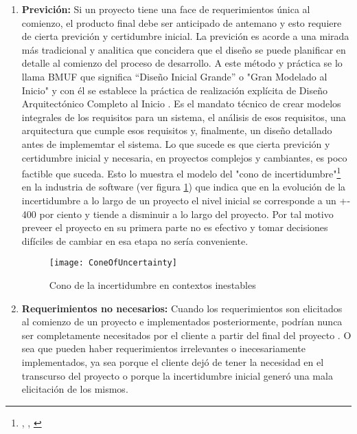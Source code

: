 \begin{enumerate}

\item \textbf{Previción:} \newline
Si un proyecto tiene una face de requerimientos única al comienzo, el producto final debe ser anticipado de antemano \cite{Scrum-Institute-2015} y esto requiere de cierta previción y certidumbre inicial. La previción es acorde a una mirada más tradicional y analitica que concidera que el diseño se puede planificar en detalle al comienzo del proceso de desarrollo. A este método y práctica se lo llama BMUF que significa “Diseño Inicial Grande” o "Gran Modelado al Inicio" y con él se establece la práctica de realización explícita de Diseño Arquitectónico Completo al Inicio \cite{Wiley-Sons-2002}. Es el mandato técnico de crear modelos integrales de los requisitos para un sistema, el análisis de esos requisitos, una arquitectura que cumple esos requisitos y, finalmente, un diseño detallado antes de implememtar el sistema. Lo que sucede es que cierta previción y certidumbre inicial y necesaria, en proyectos complejos y cambiantes, es poco factible que suceda. Esto lo muestra el modelo del "cono de incertidumbre"\footnote{\cite{McConnell-2006}, \cite{Boehm-1981}, \cite{Martin-Alaimo-2014}} en la industria de software (ver figura \ref{fig:ConeOfUncertainty}) que indica que en la evolución de la incertidumbre a lo largo de un proyecto el nivel inicial se corresponde a un +- 400 por ciento y tiende a disminuir a lo largo del proyecto. Por tal motivo preveer el proyecto en su primera parte no es efectivo y tomar decisiones difíciles de cambiar en esa etapa no sería conveniente.

\begin{figure}[h]
  \centering
  \texttt{[image: ConeOfUncertainty]}
  \caption{Cono de la incertidumbre en contextos inestables}
  \centering
  \label{fig:ConeOfUncertainty} %
\end{figure}

\item \textbf{Requerimientos no necesarios:} \newline
Cuando los requerimientos son elicitados al comienzo de un proyecto e implementados posteriormente, podrían nunca ser completamente necesitados por el cliente a partir del final del proyecto \cite{Scrum-Institute-2015}. O sea que pueden haber requerimientos irrelevantes o inecesariamente implementados, ya sea porque el cliente dejó de tener la necesidad en el transcurso del proyecto o porque la incertidumbre inicial generó una mala elicitación de los mismos.


\end{enumerate}
